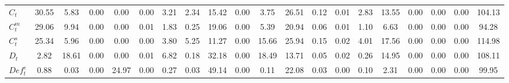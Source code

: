 \begin{center}
\begin{longtable}{lccccccccccccccccccc}
$ C_t                       $	 & 	               30.55	 & 	                5.83	 & 	                0.00	 & 	                0.00	 & 	                0.00	 & 	                3.21	 & 	                2.34	 & 	               15.42	 & 	                0.00	 & 	                3.75	 & 	               26.51	 & 	                0.12	 & 	                0.01	 & 	                2.83	 & 	               13.55	 & 	                0.00	 & 	                0.00	 & 	                0.00	 & 	              104.13 \\ 
$ C^m_t                     $	 & 	               29.06	 & 	                9.94	 & 	                0.00	 & 	                0.00	 & 	                0.01	 & 	                1.83	 & 	                0.25	 & 	               19.06	 & 	                0.00	 & 	                5.39	 & 	               20.94	 & 	                0.06	 & 	                0.01	 & 	                1.10	 & 	                6.63	 & 	                0.00	 & 	                0.00	 & 	                0.00	 & 	               94.28 \\ 
$ C^s_t                     $	 & 	               25.34	 & 	                5.96	 & 	                0.00	 & 	                0.00	 & 	                0.00	 & 	                3.80	 & 	                5.25	 & 	               11.27	 & 	                0.00	 & 	               15.66	 & 	               25.94	 & 	                0.15	 & 	                0.02	 & 	                4.01	 & 	               17.56	 & 	                0.00	 & 	                0.00	 & 	                0.00	 & 	              114.98 \\ 
$ D_t                       $	 & 	                2.82	 & 	               18.61	 & 	                0.00	 & 	                0.00	 & 	                0.01	 & 	                6.82	 & 	                0.18	 & 	               32.18	 & 	                0.00	 & 	               18.49	 & 	               13.71	 & 	                0.05	 & 	                0.02	 & 	                0.26	 & 	               14.95	 & 	                0.00	 & 	                0.00	 & 	                0.00	 & 	              108.11 \\ 
$ Def^e_t                   $	 & 	                0.88	 & 	                0.03	 & 	                0.00	 & 	               24.97	 & 	                0.00	 & 	                0.27	 & 	                0.03	 & 	               49.14	 & 	                0.00	 & 	                0.11	 & 	               22.08	 & 	                0.03	 & 	                0.00	 & 	                0.10	 & 	                2.31	 & 	                0.00	 & 	                0.00	 & 	                0.00	 & 	               99.95 \\ 

\end{longtable}
\end{center}
